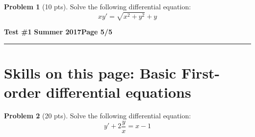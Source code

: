 \documentclass[12pt]{article}
\theoremstyle{definition}
\newtheorem{problem}{Problem}
\begin{document}
\begin{problem}[10 pts]
Solve the following differential equation:
\begin{equation*}
xy' = \sqrt{x^2+y^2} + y
\end{equation*}

\vspace{9cm}
\begin{flushright}
\end{flushright}
\end{problem}
\newpage


\hfill{\large\bf Test \#1}\hfill{\large\bf
Summer 2017}\hfill{\large\bf Page 5/5}\hrule

\section*{Skills on this page: Basic First-order differential equations}

\begin{problem}[20 pts]
Solve the following differential equation:
\begin{equation*}
y'+2\frac{y}{x} = x-1
\end{equation*}

\vspace{18cm}
\begin{flushright}
\end{flushright}
\end{problem}
\end{document}
